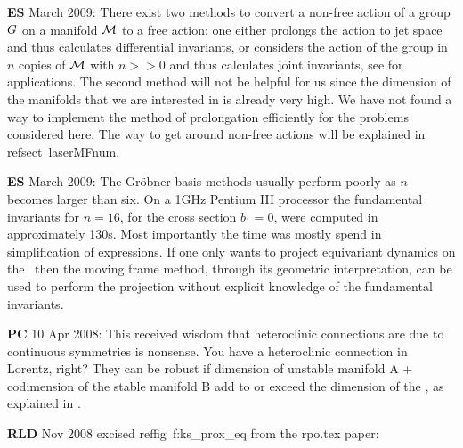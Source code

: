 {\bf ES} March 2009:
There exist two methods to convert a non-free action of a group $G$ on a manifold $\mathcal{M}$
to a free action: one either prolongs the action to jet space
and thus calculates differential invariants, or considers the
action of the group in $n$ copies of $\mathcal{M}$ with $n>>0$ and
thus calculates joint invariants, see  for
applications. The second method will not be helpful for us
since the dimension of the manifolds that we are interested
in is already very high. We have not found a way to implement
the method of prolongation efficiently for the problems
considered here. The way to get around non-free actions will
be explained in refsect~{laserMFnum}.


{\bf ES} March 2009:
The Gr\"{o}bner basis methods usually perform poorly as $n$
becomes larger than six. On a 1GHz Pentium III processor the
fundamental invariants for $n=16$, for the cross section
$b_1=0$, were computed in approximately 130s. Most
importantly the time was mostly spend in simplification of
expressions. If one only wants to project equivariant
dynamics on the \reducedsp\ then the moving frame method,
through its geometric interpretation, can be used to perform
the projection without explicit knowledge of the fundamental
invariants.

{\bf PC} 10 Apr 2008:
    This received wisdom that heteroclinic connections
    are due to continuous symmetries is nonsense. You have a
    heteroclinic connection in Lorentz, right? They can be
    robust if dimension of unstable manifold A + codimension
    of the stable manifold B add to or exceed the dimension
    of the \statesp, as explained in .

{\bf RLD} Nov 2008  excised reffig~{f:ks\_prox\_eq} from the rpo.tex paper:

